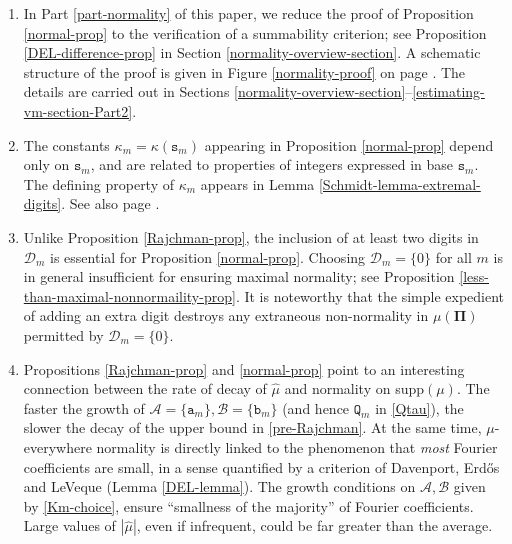 \documentclass[12pt, twoside]{article}
\theoremstyle{definition}
\numberwithin{equation}{section}
\begin{document}
\begin{enumerate}[1.] 
\item In Part \ref{part-normality} of this paper, we reduce the proof of Proposition \ref{normal-prop} to the verification of a summability criterion; see Proposition \ref{DEL-difference-prop} in Section \ref{normality-overview-section}. A schematic structure of the proof is given in Figure \ref{normality-proof} on page \pageref{normality-proof}. The details are carried out in Sections \ref{normality-overview-section}--\ref{estimating-vm-section-Part2}. 
\item The constants $\kappa_m = \kappa(\mathtt s_m)$ appearing in Proposition \ref{normal-prop} depend only on $\mathtt s_m$, and are related to properties of integers expressed in base $\mathtt s_m$. The defining property of $\kappa_m$ appears in Lemma \ref{Schmidt-lemma-extremal-digits}. See also page \pageref{kappa-crossref}. 
\item Unlike Proposition \ref{Rajchman-prop}, the inclusion of at least two digits in $\mathscr{D}_m$ is essential for Proposition \ref{normal-prop}. Choosing $\mathscr{D}_m = \{0\}$ for all $m$ is in general insufficient for ensuring maximal normality; see Proposition \ref{less-than-maximal-nonnormaility-prop}. 
It is noteworthy that the simple expedient of adding an extra digit destroys any extraneous non-normality in $\mu(\pmb{\Pi})$ permitted by $\mathscr{D}_m =\{0\}$.   
\item Propositions \ref{Rajchman-prop} and \ref{normal-prop} point to an interesting connection between the rate of decay of $\widehat{\mu}$ and normality on supp$(\mu)$. The faster the growth of $\mathcal A = \{\mathtt a_m\}, \mathcal B = \{\mathtt b_m\}$ (and hence $\mathtt Q_m$ in \eqref{Qtau}), the slower the decay of the upper bound in \eqref{pre-Rajchman}. At the same time, $\mu$-everywhere normality is directly linked to the phenomenon that {\em{most}} Fourier coefficients are small, in a sense quantified by a criterion of Davenport, Erd\H{o}s and LeVeque (Lemma \ref{DEL-lemma}). The growth conditions on $\mathcal A, \mathcal B$ given by \eqref{Km-choice}, ensure ``smallness of the majority'' of Fourier coefficients. Large values of $|\widehat{\mu}|$, even if infrequent, could be far greater than the average.   

\end{enumerate}
\end{document}

